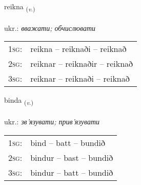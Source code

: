 \documentclass[frontgrid, backgrid]{flacards}\usepackage[]{graphicx}\usepackage[]{xcolor}
\begin{document}
\renewcommand{\flhead}{\vskip5pt \fboxsep=0pt {\small\bfseries\footnotesize Sagnorð | дієслово}}
\renewcommand{\fcfoot}{\vskip5pt \fboxsep=0pt \hspace{2pt}{\small\bfseries\footnotesize 1K}}

\renewcommand{\blhead}{\vskip5pt {\small\bfseries\footnotesize Sagnorð | дієслово }}
\renewcommand{\bcfoot}{\vskip5pt \hspace{2pt}{\small\bfseries\footnotesize 1K}}


{reikna \small{\textsubscript{(\textit{v.})}} \\[1ex] %
\textphonetic{[reihkna]} \\
ukr.: \emph{вважати; обчислювати} \\  [2ex]
\renewcommand*{\arraystretch}{0.8}
\begin{tabular}{p{1cm}l}
\textsc{1sg}: & reikna -- reiknaði -- reiknað \\ 
\textsc{2sg}: & reiknar -- reiknaðir -- reiknað \\ 
\textsc{3sg}: & reiknar -- reiknaði -- reiknað \\ 
\end{tabular}
}

\renewcommand{\flhead}{\vskip5pt \fboxsep=0pt {\small\bfseries\footnotesize Sagnorð | дієслово}}
\renewcommand{\fcfoot}{\vskip5pt \fboxsep=0pt \hspace{2pt}{\small\bfseries\footnotesize 1K}}

\renewcommand{\blhead}{\vskip5pt {\small\bfseries\footnotesize Sagnorð | дієслово }}
\renewcommand{\bcfoot}{\vskip5pt \hspace{2pt}{\small\bfseries\footnotesize 1K}}


{binda \small{\textsubscript{(\textit{v.})}} \\[1ex] %
\textphonetic{[pɪnta]} \\
ukr.: \emph{зв'язувати; прив'язувати} \\  [2ex]
\renewcommand*{\arraystretch}{0.8}
\begin{tabular}{p{1cm}l}
\textsc{1sg}: & bind -- batt -- bundið \\ 
\textsc{2sg}: & bindur -- bast -- bundið \\ 
\textsc{3sg}: & bindur -- batt -- bundið \\ 
\end{tabular}
}
\end{document}
